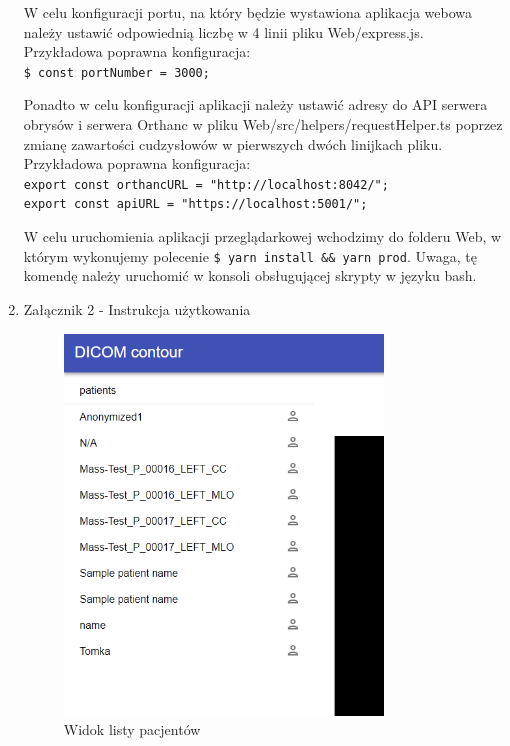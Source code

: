 \documentclass[a4paper,11pt,twoside,openright]{report}
\theoremstyle{definition}
\begin{document}
\begin{enumerate}
W celu konfiguracji portu, na który będzie wystawiona aplikacja webowa należy
ustawić odpowiednią liczbę w 4 linii pliku Web/express.js. Przykładowa poprawna
konfiguracja:\\
\texttt{\$ const portNumber = 3000;}

Ponadto w celu konfiguracji aplikacji należy ustawić adresy do API serwera obrysów
i serwera Orthanc w pliku Web/src/helpers/requestHelper.ts poprzez zmianę zawartości
cudzysłowów w pierwszych dwóch linijkach pliku. 	Przykładowa poprawna konfiguracja:\\
\texttt{export const orthancURL = "http://localhost:8042/";}\\
\texttt{export const apiURL = "https://localhost:5001/";}

W celu uruchomienia aplikacji przeglądarkowej wchodzimy do folderu Web, w którym
wykonujemy polecenie \texttt{\$ yarn install \&\& yarn prod}. Uwaga, tę komendę
należy uruchomić w konsoli obsługującej skrypty w języku bash.





\item Załącznik 2 - Instrukcja użytkowania

\begin{figure}[h!]
	\center
	\includegraphics[width=0.8\textwidth]{1}
	\caption{Widok listy pacjentów}
    	\label{fig:1}
\end{figure}


\end{enumerate}
\end{document}

